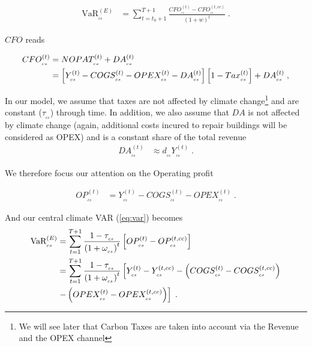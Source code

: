 \begin{align}
\text{VaR}^{(E)}_{_{cs}}&=\sum_{t=t_0+1}^{T+1}\frac{CFO^{(t)}_{_{cs}}-CFO^{(t,cc)}_{_{cs}}}{(1+w)^t}\;.
\end{align}

$CFO$ reads

\begin{align}
CFO^{(t)}_{_{cs}}&=NOPAT^{(t)}_{_{cs}}+DA^{(t)}_{_{cs}}\notag\\
%
&=\left[Y^{(t)}_{_{cs}}-COGS^{(t)}_{_{cs}}-OPEX^{(t)}_{_{cs}}-DA^{(t)}_{_{cs}}\right]
%
\left[1-Tax^{(t)}_{_{cs}}\right]+DA^{(t)}_{_{cs}}\;,
\end{align}

In our model, we assume that taxes are not affected by climate change\footnote{We will see later that Carbon Taxes are taken into account via the Revenue and the OPEX channel} and are constant ($\tau_{_{cs}}$) through time. In addition, we also assume that $DA$ is not affected by climate change (again, additional costs incured to repair buildings will be considered as OPEX) and is a constant share of the total revenue
\begin{align}
DA^{(t)}_{_{cs}}&\approx d_{_{cs}} Y^{(t)}_{_{cs}}\;.
\end{align}

We therefore focus our attention on the Operating profit

\begin{align}
OP^{(t)}_{_{cs}}&=Y^{(t)}_{_{cs}}-COGS^{(t)}_{_{cs}}-OPEX^{(t)}_{_{cs}}\;.\label{eq:profit}
\end{align}

And our central climate VAR (\ref{eq:var}) becomes
\begin{align}
\text{VaR}^{(E)}_{_{cs}}&=
%
\sum_{t=1}^{T+1}\frac{1-\tau_{_{cs}}}{\left(1+\omega_{_{cs}}\right)^t}\left[OP^{(t)}_{_{cs}}-OP^{(t,cc)}_{_{cs}}\right]\notag\\
%
&=\sum_{t=1}^{T+1}\frac{1-\tau_{_{cs}}}{\left(1+\omega_{_{cs}}\right)^t}\left[
%
Y^{(t)}_{_{cs}}-Y^{(t,cc)}_{_{cs}}-\left(COGS^{(t)}_{_{cs}}-COGS^{(t,cc)}_{_{cs}}\right)
%
\right.\notag\\
%
&\left.  -\left(OPEX^{(t)}_{_{cs}}-OPEX^{(t,cc)}_{_{cs}}\right)\right]\;.
\end{align}

